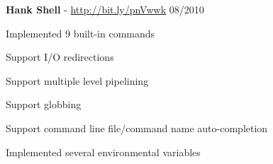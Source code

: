 \documentclass[margin,line]{resume}
\begin{document}
\begin{resume}
    \textbf{Hank Shell} - \url{http://bit.ly/pnVwwk} \hfill 08/2010 \vspace{-3mm}\\\vspace{-1mm}%
      \begin{list2}
       \item Implemented 9 built-in commands
       \item Support I/O redirections
       \item Support multiple level pipelining
       \item Support globbing
       \item Support command line file/command name auto-completion
       \item Implemented several environmental variables
      \end{list2}

\end{resume}
\end{document}
